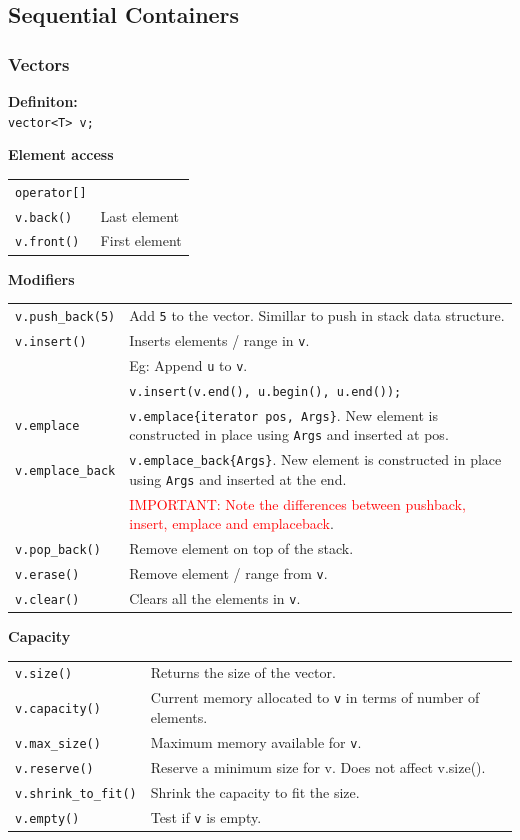 \subsection{Sequential Containers}

\subsubsection{Vectors}

\textbf{Definiton:}\\
\texttt{vector<T> v;} 

\textbf{Element access}

\begin{tabularx}{\linewidth}{lX}
\texttt{operator[]}	& \\
\texttt{v.back()} & Last element \\
\texttt{v.front()} & First element \\
\end{tabularx}


\textbf{Modifiers}

\begin{tabularx}{\linewidth}{lX}
\texttt{v.push\_back(5)} & Add \texttt{5} to the vector. Simillar to push in stack data structure.\\
\texttt{v.insert()} & Inserts elements / range in \texttt{v}.\\
& Eg: Append \texttt{u} to \texttt{v}.\\
& \texttt{v.insert(v.end(), u.begin(), u.end());}\\
\texttt{v.emplace} & \texttt{v.emplace\{iterator pos, Args\}}. New element is constructed in place using \texttt{Args} and inserted at pos.\\
\texttt{v.emplace\_back} & \texttt{v.emplace\_back\{Args\}}. New element is constructed in place using \texttt{Args} and inserted at the end.\\
& \textcolor{red}{IMPORTANT: Note the differences between pushback, insert, emplace and emplaceback}.\\
\texttt{v.pop\_back()} & Remove element on top of the stack.\\
\texttt{v.erase()} & Remove element / range from \texttt{v}.\\
\texttt{v.clear()} & Clears all the elements in \texttt{v}.\\
\end{tabularx}

\textbf{Capacity}

\begin{tabularx}{\linewidth}{lX}
\texttt{v.size()} & Returns the size of the vector.\\
\texttt{v.capacity()} & Current memory allocated to \texttt{v} in terms of number of elements.\\
\texttt{v.max\_size()} & Maximum memory available for \texttt{v}.\\
\texttt{v.reserve()} & Reserve a minimum size for v. Does not affect v.size().\\
\texttt{v.shrink\_to\_fit()} & Shrink the capacity to fit the size.\\
\texttt{v.empty()} & Test if \texttt{v} is empty.\\
\end{tabularx}

